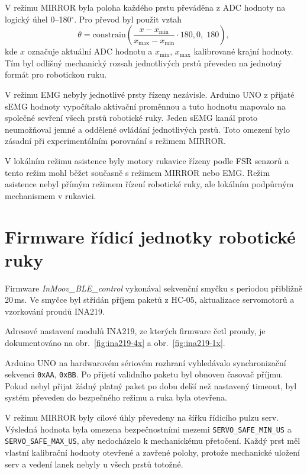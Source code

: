V režimu MIRROR byla poloha každého prstu převáděna z ADC hodnoty na logický úhel 0--180$^\circ$. Pro převod byl použit vztah
\begin{equation}
    \theta = \mathrm{constrain}\!\left(
        \frac{x - x_{\min}}{x_{\max} - x_{\min}} \cdot 180,
        0,\;180
    \right),
\end{equation}
kde $x$ označuje aktuální ADC hodnotu a $x_{\min}$, $x_{\max}$ kalibrované krajní hodnoty. Tím byl odlišný mechanický rozsah jednotlivých prstů převeden na jednotný formát pro robotickou ruku.

V režimu EMG nebyly jednotlivé prsty řízeny nezávisle. Arduino UNO z přijaté sEMG hodnoty vypočítalo aktivační proměnnou a tuto hodnotu mapovalo na společné sevření všech prstů robotické ruky. Jeden sEMG kanál proto neumožňoval jemné a oddělené ovládání jednotlivých prstů. Toto omezení bylo zásadní při experimentálním porovnání s režimem MIRROR\@.

V lokálním režimu asistence byly motory rukavice řízeny podle FSR senzorů a tento režim mohl běžet současně s režimem MIRROR nebo EMG\@. Režim asistence nebyl přímým režimem řízení robotické ruky, ale lokálním podpůrným mechanismem v rukavici.

\section{Firmware řídicí jednotky robotické ruky}
\label{sec:firmware-roboticke-ruky}

Firmware \textit{InMoov\_BLE\_control} vykonával sekvenční smyčku s periodou přibližně 20\,ms. Ve smyčce byl střídán příjem paketů z HC-05, aktualizace servomotorů a vzorkování proudů INA219.

Adresové nastavení modulů INA219, ze kterých firmware četl proudy, je dokumentováno na obr.~\ref{fig:ina219-4x} a obr.~\ref{fig:ina219-1x}.

Arduino UNO na hardwarovém sériovém rozhraní vyhledávalo synchronizační sekvenci \texttt{0xAA}, \texttt{0xBB}. Po přijetí validního paketu byl obnoven časovač příjmu. Pokud nebyl přijat žádný platný paket po dobu delší než nastavený timeout, byl systém převeden do bezpečného režimu a ruka byla otevřena.

V režimu MIRROR byly cílové úhly převedeny na šířku řídicího pulzu serv. Výsledná hodnota byla omezena bezpečnostními mezemi \texttt{SERVO\_SAFE\_MIN\_US} a \texttt{SERVO\_SAFE\_MAX\_US}, aby nedocházelo k mechanickému přetočení. Každý prst měl vlastní kalibrační hodnoty otevřené a zavřené polohy, protože mechanické uložení serv a vedení lanek nebyly u všech prstů totožné.

